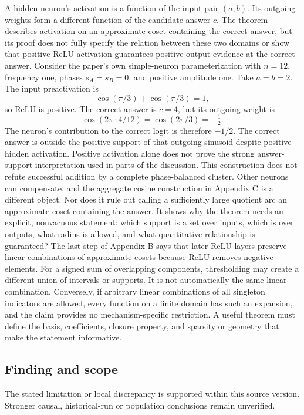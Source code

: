 \documentclass[11pt]{article}
\begin{document}
A hidden neuron's activation is a function of the input pair \((a,b)\). Its outgoing weights form a different function of the candidate answer \(c\). The theorem describes activation on an approximate coset containing the correct answer, but its proof does not fully specify the relation between these two domains or show that positive ReLU activation guarantees positive output evidence at the correct answer. Consider the paper's own simple-neuron parameterization with \(n=12\), frequency one, phases \(s_A=s_B=0\), and positive amplitude one. Take \(a=b=2\). The input preactivation is \[
\cos(\pi/3)+\cos(\pi/3)=1,
\] so ReLU is positive. The correct answer is \(c=4\), but its outgoing weight is \[
\cos(2\pi\cdot4/12)=\cos(2\pi/3)=-\tfrac12.
\] The neuron's contribution to the correct logit is therefore \(-1/2\). The correct answer is outside the positive support of that outgoing sinusoid despite positive hidden activation. Positive activation alone does not prove the strong answer-support interpretation used in parts of the discussion. This construction does not refute successful addition by a complete phase-balanced cluster. Other neurons can compensate, and the aggregate cosine construction in Appendix C is a different object. Nor does it rule out calling a sufficiently large quotient arc an approximate coset containing the answer. It shows why the theorem needs an explicit, nonvacuous statement: which support is a set over inputs, which is over outputs, what radius is allowed, and what quantitative relationship is guaranteed? The last step of Appendix B says that later ReLU layers preserve linear combinations of approximate cosets because ReLU removes negative elements. For a signed sum of overlapping components, thresholding may create a different union of intervals or supports. It is not automatically the same linear combination. Conversely, if arbitrary linear combinations of all singleton indicators are allowed, every function on a finite domain has such an expansion, and the claim provides no mechanism-specific restriction. A useful theorem must define the basis, coefficients, closure property, and sparsity or geometry that make the statement informative.

\subsection*{Finding and scope}

The stated limitation or local discrepancy is supported within this source version. Stronger causal, historical-run or population conclusions remain unverified.
\end{document}
